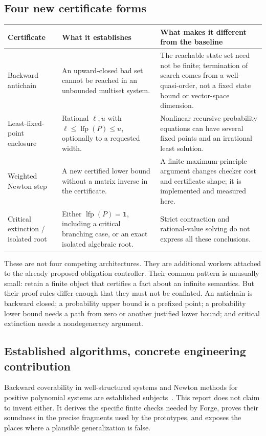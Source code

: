 \documentclass[11pt,a4paper]{article}
\theoremstyle{definition}\newtheorem{definition}[theorem]{Definition}
\theoremstyle{remark}\newtheorem{remark}[theorem]{Remark}
\newcommand{\one}{\mathbf 1}\newcommand{\zero}{\mathbf 0}
\newcommand{\lfp}{\operatorname{lfp}}\newcommand{\diag}{\operatorname{diag}}
\begin{document}
\subsection{Four new certificate forms}
\begin{table}[htbp]
\centering\small
\begin{tabular}{P{0.21\textwidth}P{0.34\textwidth}P{0.36\textwidth}}
\toprule
Certificate & What it establishes & What makes it different from the baseline \\
\midrule
Backward antichain & An upward-closed bad set cannot be reached in an unbounded multiset system. & The reachable state set need not be finite; termination of search comes from a well-quasi-order, not a fixed state bound or vector-space dimension.\\[4pt]
Least-fixed-point enclosure & Rational $\ell,u$ with $\ell\le\lfp(P)\le u$, optionally to a requested width. & Nonlinear recursive probability equations can have several fixed points and an irrational least solution.\\[4pt]
Weighted Newton step & A new certified lower bound without a matrix inverse in the certificate. & A finite maximum-principle argument changes checker cost and certificate shape; it is implemented and measured here.\\[4pt]
Critical extinction / isolated root & Either $\lfp(P)=\one$, including a critical branching case, or an exact isolated algebraic root. & Strict contraction and rational-value solving do not express all these conclusions.\\
\bottomrule
\end{tabular}
\end{table}

These are not four competing architectures. They are additional workers attached to the already proposed obligation controller. Their common pattern is unusually small: retain a finite object that certifies a fact about an infinite semantics. But their proof rules differ enough that they must not be conflated. An antichain is backward closed; a probability upper bound is a prefixed point; a probability lower bound needs a path from zero or another justified lower bound; and critical extinction needs a nondegeneracy argument.

\subsection{Established algorithms, concrete engineering contribution}
Backward coverability in well-structured systems and Newton methods for positive polynomial systems are established subjects~\cite{finkel-schnoebelen,esparza-kiefer-luttenberger,etessami-stewart-yannakakis}. This report does not claim to invent either. It derives the specific finite checks needed by Forge, proves their soundness in the precise fragments used by the prototypes, and exposes the places where a plausible generalization is false.
\end{document}
